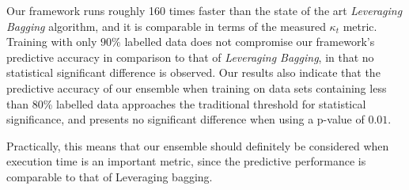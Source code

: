 Our framework runs roughly 160 times faster than the state of the art \textit{Leveraging Bagging} algorithm, and it is comparable in terms of the measured $\kappa_t$ metric. Training with only $90\%$ labelled data does not compromise our framework's predictive accuracy in comparison to that of \textit{Leveraging Bagging}, in that no statistical significant difference is observed. Our results also indicate that the predictive accuracy of our ensemble when training on data sets containing less than 80\% labelled data approaches the traditional threshold for statistical significance, and presents no significant difference when using a p-value of $0.01$.

Practically, this means that our ensemble should definitely be considered when execution time is an important metric, since the predictive performance is comparable to that of Leveraging bagging.